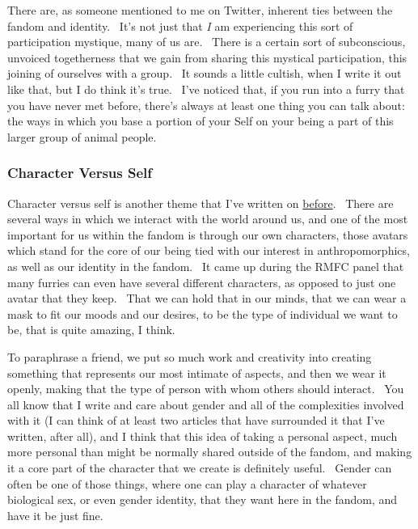 There are, as someone mentioned to me on Twitter, inherent ties between
the fandom and identity. ~It's not just that \emph{I} am experiencing
this sort of participation mystique, many of us are. ~There is a certain
sort of subconscious, unvoiced togetherness that we gain from sharing
this mystical participation, this joining of ourselves with a group. ~It
sounds a little cultish, when I write it out like that, but I do think
it's true. ~I've noticed that, if you run into a furry that you have
never met before, there's always at least one thing you can talk about:
the ways in which you base a portion of your Self on your being a part
of this larger group of animal people.

\subsubsection{Character Versus Self}\label{character-versus-self}

Character versus self is another theme that I've written on
\href{http://adjectivespecies.com/2011/11/23/character-versus-self/}{before}.
~There are several ways in which we interact with the world around us,
and one of the most important for us within the fandom is through our
own characters, those avatars which stand for the core of our being tied
with our interest in anthropomorphics, as well as our identity in the
fandom. ~It came up during the RMFC panel that many furries can even
have several different characters, as opposed to just one avatar that
they keep. ~That we can hold that in our minds, that we can wear a mask
to fit our moods and our desires, to be the type of individual we want
to be, that is quite amazing, I think.

To paraphrase a friend, we put so much work and creativity into creating
something that represents our most intimate of aspects, and then we wear
it openly, making that the type of person with whom others should
interact. ~You all know that I write and care about gender and all of
the complexities involved with it (I can think of at least two articles
that have surrounded it that I've written, after all), and I think that
this idea of taking a personal aspect, much more personal than might be
normally shared outside of the fandom, and making it a core part of the
character that we create is definitely useful. ~Gender can often be one
of those things, where one can play a character of whatever biological
sex, or even gender identity, that they want here in the fandom, and
have it be just fine.

